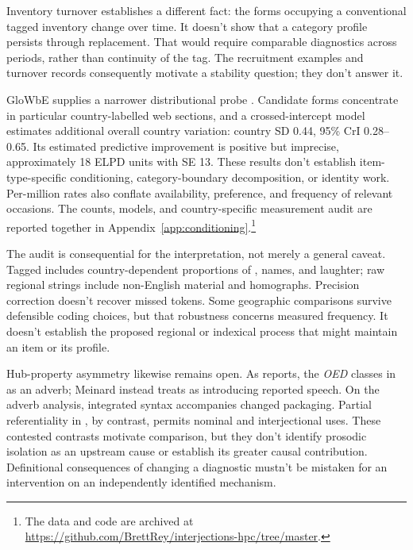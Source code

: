 \documentclass[12pt]{article}
\newif\ifblind
\begin{document}
Inventory turnover establishes a different fact: the forms occupying a conventional tagged inventory change over time. It doesn't show that a category profile persists through replacement. That would require comparable diagnostics across periods, rather than continuity of the tag. The recruitment examples and turnover records consequently motivate a stability question; they don't answer it.

GloWbE supplies a narrower distributional probe \citep{daviesfuchs2015}. Candidate forms concentrate in particular country-labelled web sections, and a crossed-intercept model estimates additional overall country variation: country SD 0.44, 95\% CrI 0.28--0.65. Its estimated predictive improvement is positive but imprecise, approximately 18 ELPD units with SE 13. These results don't establish item-type-specific conditioning, category-boundary decomposition, or identity work. Per-million rates also conflate availability, preference, and frequency of relevant occasions. The counts, models, and country-specific measurement audit are reported together in Appendix~\ref{app:conditioning}.\footnote{\ifblind Available at [link removed for blind review].\else The data and code are archived at \url{https://github.com/BrettRey/interjections-hpc/tree/master}.\fi}

The audit is consequential for the interpretation, not merely a general caveat. Tagged  includes country-dependent proportions of , names, and laughter; raw regional strings include non-English material and homographs. Precision correction doesn't recover missed tokens. Some geographic comparisons survive defensible coding choices, but that robustness concerns measured frequency. It doesn't establish the proposed regional or indexical process that might maintain an item or its profile.

Hub-property asymmetry likewise remains open. As \textcite[151--152]{meinard2015} reports, the \textit{OED} classes  in  as an adverb; Meinard instead treats  as introducing reported speech. On the adverb analysis, integrated syntax accompanies changed packaging. Partial referentiality in , by contrast, permits nominal and interjectional uses. These contested contrasts motivate comparison, but they don't identify prosodic isolation as an upstream cause or establish its greater causal contribution. Definitional consequences of changing a diagnostic mustn't be mistaken for an intervention on an independently identified mechanism.
\end{document}

